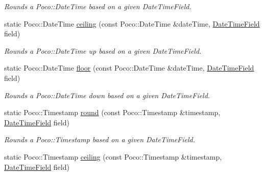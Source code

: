 \begin{DoxyCompactItemize}
\begin{DoxyCompactList}\small\item\em Rounds a Poco\-::\-Date\-Time based on a given Date\-Time\-Field. \end{DoxyCompactList}\item 
\hypertarget{classofx_1_1_time_1_1_utils_a5a411b1d4d967a444b59d91c0d37f7fa}{static Poco\-::\-Date\-Time \hyperlink{classofx_1_1_time_1_1_utils_a5a411b1d4d967a444b59d91c0d37f7fa}{ceiling} (const Poco\-::\-Date\-Time \&date\-Time, \hyperlink{classofx_1_1_time_1_1_utils_aaab0e5bd305761231f063a0701785112}{Date\-Time\-Field} field)}\label{classofx_1_1_time_1_1_utils_a5a411b1d4d967a444b59d91c0d37f7fa}

\begin{DoxyCompactList}\small\item\em Rounds a Poco\-::\-Date\-Time up based on a given Date\-Time\-Field. \end{DoxyCompactList}\item 
\hypertarget{classofx_1_1_time_1_1_utils_a6e496a915b1624b41ba9eee161bcca02}{static Poco\-::\-Date\-Time \hyperlink{classofx_1_1_time_1_1_utils_a6e496a915b1624b41ba9eee161bcca02}{floor} (const Poco\-::\-Date\-Time \&date\-Time, \hyperlink{classofx_1_1_time_1_1_utils_aaab0e5bd305761231f063a0701785112}{Date\-Time\-Field} field)}\label{classofx_1_1_time_1_1_utils_a6e496a915b1624b41ba9eee161bcca02}

\begin{DoxyCompactList}\small\item\em Rounds a Poco\-::\-Date\-Time down based on a given Date\-Time\-Field. \end{DoxyCompactList}\item 
\hypertarget{classofx_1_1_time_1_1_utils_aab9c5ac41cc8fee9a1aec6ae39309260}{static Poco\-::\-Timestamp \hyperlink{classofx_1_1_time_1_1_utils_aab9c5ac41cc8fee9a1aec6ae39309260}{round} (const Poco\-::\-Timestamp \&timestamp, \hyperlink{classofx_1_1_time_1_1_utils_aaab0e5bd305761231f063a0701785112}{Date\-Time\-Field} field)}\label{classofx_1_1_time_1_1_utils_aab9c5ac41cc8fee9a1aec6ae39309260}

\begin{DoxyCompactList}\small\item\em Rounds a Poco\-::\-Timestamp based on a given Date\-Time\-Field. \end{DoxyCompactList}\item 
\hypertarget{classofx_1_1_time_1_1_utils_a3cc7e578bbf2bad7c3405ee1d10e81de}{static Poco\-::\-Timestamp \hyperlink{classofx_1_1_time_1_1_utils_a3cc7e578bbf2bad7c3405ee1d10e81de}{ceiling} (const Poco\-::\-Timestamp \&timestamp, \hyperlink{classofx_1_1_time_1_1_utils_aaab0e5bd305761231f063a0701785112}{Date\-Time\-Field} field)}\label{classofx_1_1_time_1_1_utils_a3cc7e578bbf2bad7c3405ee1d10e81de}


\end{DoxyCompactItemize}
